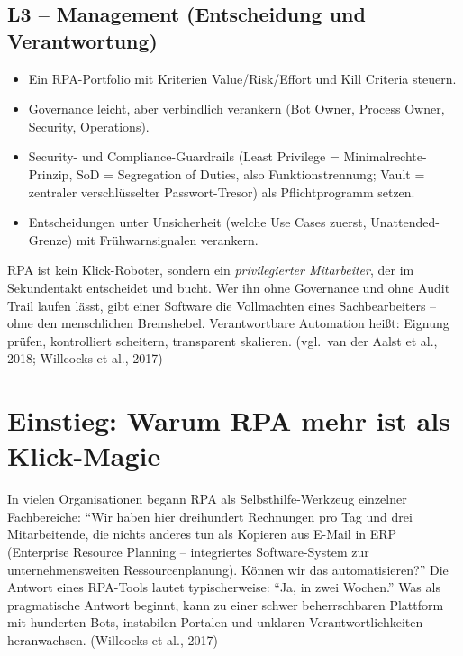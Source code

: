 \documentclass[11pt,a4paper,oneside]{article}
\newcommand{\quelle}[1]{{\footnotesize\color{lpGray}(#1)}}
\begin{document}
\subsection*{L3 -- Management (Entscheidung und Verantwortung)}
\begin{itemize}
  \item Ein RPA-Portfolio mit Kriterien Value/Risk/Effort und Kill Criteria steuern.
  \item Governance leicht, aber verbindlich verankern (Bot Owner, Process Owner, Security, Operations).
  \item Security- und Compliance-Guardrails (Least Privilege = Minimalrechte-Prinzip, SoD = Segregation of Duties, also Funktionstrennung; Vault = zentraler verschl\"usselter Passwort-Tresor) als Pflichtprogramm setzen.
  \item Entscheidungen unter Unsicherheit (welche Use Cases zuerst, Unattended-Grenze) mit Frühwarnsignalen verankern.
\end{itemize}

\begin{merkbox}
RPA ist kein Klick-Roboter, sondern ein \emph{privilegierter Mitarbeiter}, der im Sekundentakt entscheidet und bucht. Wer ihn ohne Governance und ohne Audit Trail laufen lässt, gibt einer Software die Vollmachten eines Sachbearbeiters -- ohne den menschlichen Bremshebel. Verantwortbare Automation heißt: Eignung prüfen, kontrolliert scheitern, transparent skalieren. \quelle{vgl.\ van der Aalst et al., 2018; Willcocks et al., 2017}
\end{merkbox}

\clearpage

\section{Einstieg: Warum RPA mehr ist als Klick-Magie}

In vielen Organisationen begann RPA als Selbsthilfe-Werkzeug einzelner Fachbereiche: ``Wir haben hier dreihundert Rechnungen pro Tag und drei Mitarbeitende, die nichts anderes tun als Kopieren aus E-Mail in ERP (Enterprise Resource Planning -- integriertes Software-System zur unternehmensweiten Ressourcenplanung). Können wir das automatisieren?'' Die Antwort eines RPA-Tools lautet typischerweise: ``Ja, in zwei Wochen.'' Was als pragmatische Antwort beginnt, kann zu einer schwer beherrschbaren Plattform mit hunderten Bots, instabilen Portalen und unklaren Verantwortlichkeiten heranwachsen. \quelle{Willcocks et al., 2017}
\end{document}
